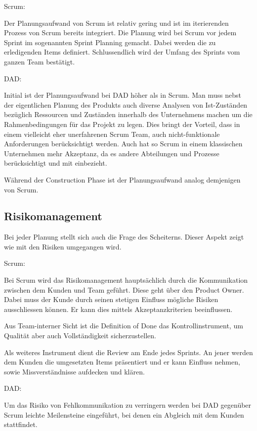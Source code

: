 {\Large Scrum:} \medskip

Der Planungsaufwand von Scrum ist relativ gering und ist im iterierenden Prozess von Scrum bereits integriert. Die Planung wird bei Scrum vor jedem Sprint im sogenannten Sprint Planning gemacht. Dabei werden die zu erledigenden Items definiert. Schlussendlich wird der Umfang des Sprints vom ganzen Team bestätigt.\bigskip 

{\Large DAD:} \medskip

Initial ist der Planungsaufwand bei DAD höher als in Scrum. Man muss nebst der eigentlichen Planung des Produkts auch diverse Analysen von Ist-Zuständen bezüglich Ressourcen und Zuständen innerhalb des Unternehmens machen um die Rahmenbedingungen für das Projekt zu legen.
Dies bringt der Vorteil, dass in einem vielleicht eher unerfahrenen Scrum Team, auch nicht-funktionale Anforderungen berücksichtigt werden. Auch hat so Scrum in einem klassischen Unternehmen mehr Akzeptanz, da es andere Abteilungen und Prozesse berücksichtigt und mit einbezieht. \medskip

Während der Construction Phase ist der Planungsaufwand analog demjenigen von Scrum.


\subsection{Risikomanagement}

Bei jeder Planung stellt sich auch die Frage des Scheiterns. Dieser Aspekt zeigt wie mit den Risiken umgegangen wird.

{\Large Scrum:} \medskip

Bei Scrum wird das Risikomanagement hauptsächlich durch die Kommunikation zwischen dem Kunden und Team geführt. Diese geht über den Product Owner. Dabei muss der Kunde durch seinen stetigen Einfluss mögliche Risiken ausschliessen können. Er kann dies mittels Akzeptanzkriterien beeinflussen.\newline

Aus Team-interner Sicht ist die Definition of Done das Kontrollinstrument, um Qualität aber auch Vollständigkeit sicherzustellen.

Als weiteres Instrument dient die Review am Ende jedes Sprints. An jener werden dem Kunden die umgesetzten Items präsentiert und er kann Einfluss nehmen, sowie Missverständnisse aufdecken und klären.

\bigskip 

{\Large DAD:} \medskip

Um das Risiko von Fehlkommunikation zu verringern werden bei DAD gegenüber Scrum leichte Meilensteine eingeführt, bei denen ein Abgleich mit dem Kunden stattfindet. \medskip

